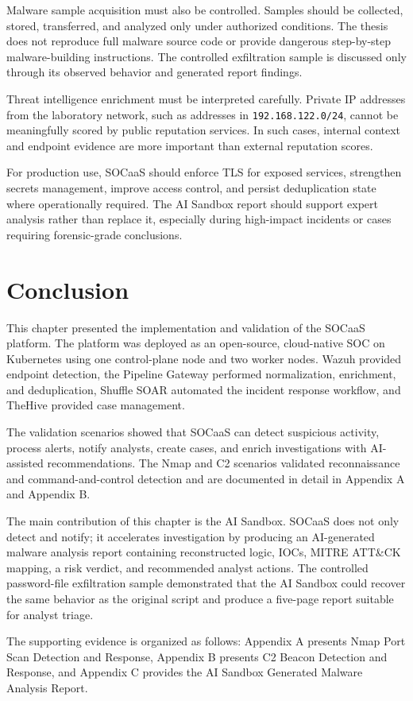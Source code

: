 Malware sample acquisition must also be controlled. Samples should be collected, stored, transferred, and analyzed only under authorized conditions. The thesis does not reproduce full malware source code or provide dangerous step-by-step malware-building instructions. The controlled exfiltration sample is discussed only through its observed behavior and generated report findings.

Threat intelligence enrichment must be interpreted carefully. Private IP addresses from the laboratory network, such as addresses in \texttt{192.168.122.0/24}, cannot be meaningfully scored by public reputation services. In such cases, internal context and endpoint evidence are more important than external reputation scores.

For production use, SOCaaS should enforce TLS for exposed services, strengthen secrets management, improve access control, and persist deduplication state where operationally required. The AI Sandbox report should support expert analysis rather than replace it, especially during high-impact incidents or cases requiring forensic-grade conclusions.

\section{Conclusion}
\label{sec:ch4-conclusion}

This chapter presented the implementation and validation of the SOCaaS platform. The platform was deployed as an open-source, cloud-native SOC on Kubernetes using one control-plane node and two worker nodes. Wazuh provided endpoint detection, the Pipeline Gateway performed normalization, enrichment, and deduplication, Shuffle SOAR automated the incident response workflow, and TheHive provided case management.

The validation scenarios showed that SOCaaS can detect suspicious activity, process alerts, notify analysts, create cases, and enrich investigations with AI-assisted recommendations. The Nmap and C2 scenarios validated reconnaissance and command-and-control detection and are documented in detail in Appendix A and Appendix B.

The main contribution of this chapter is the AI Sandbox. SOCaaS does not only detect and notify; it accelerates investigation by producing an AI-generated malware analysis report containing reconstructed logic, IOCs, MITRE ATT\&CK mapping, a risk verdict, and recommended analyst actions. The controlled password-file exfiltration sample demonstrated that the AI Sandbox could recover the same behavior as the original script and produce a five-page report suitable for analyst triage.

The supporting evidence is organized as follows: Appendix A presents Nmap Port Scan Detection and Response, Appendix B presents C2 Beacon Detection and Response, and Appendix C provides the AI Sandbox Generated Malware Analysis Report.

